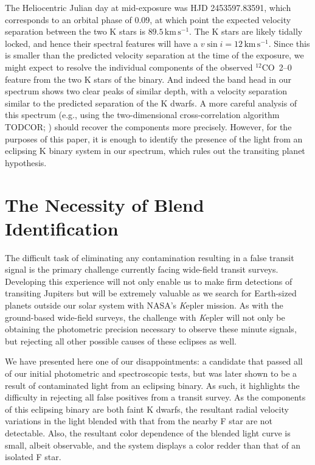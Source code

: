The Heliocentric Julian day at mid-exposure was HJD 2453597.83591,
which corresponds to an orbital phase of 0.09, at which point the
expected velocity separation between the two K stars is
$89.5\,\mathrm{km\,s^{-1}}$.  The K stars are likely tidally locked,
and hence their spectral features will have a $v \sin{i} =
12\,\mathrm{km\,s^{-1}}$. Since this is smaller than the predicted
velocity separation at the time of the exposure, we might expect to
resolve the individual components of the observed \mbox{$^{12}$CO 2--0} feature
from the two K stars of the binary. And indeed the band head in our
spectrum shows two clear peaks of similar depth, with a velocity
separation similar to the predicted separation of the K dwarfs. A more
careful analysis of this spectrum (e.g., using the two-dimensional cross-correlation algorithm TODCOR;
\citealt{Zucker_Mazeh:apj:1994a}) should recover the components more
precisely. However, for the purposes of this paper, it is enough to
identify the presence of the light from an eclipsing K binary system
in our spectrum, which rules out the transiting planet hypothesis.

\section{The Necessity of Blend Identification}\label{cha:gsc:sec:dis}

The difficult task of eliminating any contamination resulting in a
false transit signal is the primary challenge currently facing wide-field transit surveys. Developing this experience will not only enable
us to make firm detections of transiting Jupiters but will be
extremely valuable as we search for Earth-sized planets outside our
solar system with NASA's {\textit Kepler} mission. As with the
ground-based wide-field surveys, the challenge with {\textit Kepler} will not
only be obtaining the photometric precision necessary to observe these
minute signals, but rejecting all other possible causes of these
eclipses as well.

We have presented here one of our disappointments: a candidate that
passed all of our initial photometric and spectroscopic tests, but was
later shown to be a result of contaminated light from an eclipsing
binary. As such, it highlights the difficulty in rejecting all false
positives from a transit survey. As the components of this eclipsing
binary are both faint K dwarfs, the resultant radial velocity
variations in the light blended with that from the nearby F star are
not detectable. Also, the resultant color dependence of the blended
light curve is small, albeit observable, and the system displays a
color redder than that of an isolated F star.

